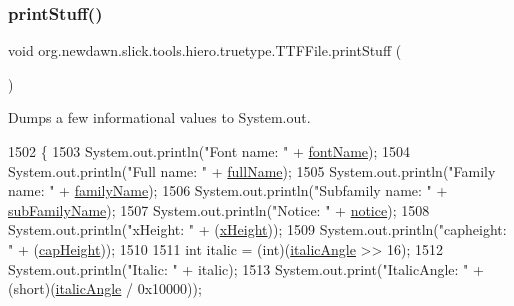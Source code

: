 \subsubsection{\texorpdfstring{print\+Stuff()}{printStuff()}}
{\footnotesize\ttfamily void org.\+newdawn.\+slick.\+tools.\+hiero.\+truetype.\+T\+T\+F\+File.\+print\+Stuff (\begin{DoxyParamCaption}{ }\end{DoxyParamCaption})\hspace{0.3cm}{\ttfamily [inline]}}

Dumps a few informational values to System.\+out. 
\begin{DoxyCode}
1502                              \{
1503         System.out.println(\textcolor{stringliteral}{"Font name:   "} + \mbox{\hyperlink{classorg_1_1newdawn_1_1slick_1_1tools_1_1hiero_1_1truetype_1_1_t_t_f_file_ab15434422810a00c9337aa7ed38f8539}{fontName}});
1504         System.out.println(\textcolor{stringliteral}{"Full name:   "} + \mbox{\hyperlink{classorg_1_1newdawn_1_1slick_1_1tools_1_1hiero_1_1truetype_1_1_t_t_f_file_ac7ecb2518ff51c2a332c69d50cfbf35b}{fullName}});
1505         System.out.println(\textcolor{stringliteral}{"Family name: "} + \mbox{\hyperlink{classorg_1_1newdawn_1_1slick_1_1tools_1_1hiero_1_1truetype_1_1_t_t_f_file_a9888cb4831ec8b916a0a8ac0f6865bbe}{familyName}});
1506         System.out.println(\textcolor{stringliteral}{"Subfamily name: "} + \mbox{\hyperlink{classorg_1_1newdawn_1_1slick_1_1tools_1_1hiero_1_1truetype_1_1_t_t_f_file_a5584d310e65c24aa3ea85ce0afe13401}{subFamilyName}});
1507         System.out.println(\textcolor{stringliteral}{"Notice:      "} + \mbox{\hyperlink{classorg_1_1newdawn_1_1slick_1_1tools_1_1hiero_1_1truetype_1_1_t_t_f_file_aff447127456bb5b74f2f604b796159b0}{notice}});
1508         System.out.println(\textcolor{stringliteral}{"xHeight:     "} + (\mbox{\hyperlink{classorg_1_1newdawn_1_1slick_1_1tools_1_1hiero_1_1truetype_1_1_t_t_f_file_ac9dd4fd59ff8fe8fbc4aac821bcd748e}{xHeight}}));
1509         System.out.println(\textcolor{stringliteral}{"capheight:   "} + (\mbox{\hyperlink{classorg_1_1newdawn_1_1slick_1_1tools_1_1hiero_1_1truetype_1_1_t_t_f_file_ab67a8ec96a9df5e61c316493705b9d1f}{capHeight}}));
1510 
1511         \textcolor{keywordtype}{int} italic = (int)(\mbox{\hyperlink{classorg_1_1newdawn_1_1slick_1_1tools_1_1hiero_1_1truetype_1_1_t_t_f_file_af306b1630e161125026d93d856324aff}{italicAngle}} >> 16);
1512         System.out.println(\textcolor{stringliteral}{"Italic:      "} + italic);
1513         System.out.print(\textcolor{stringliteral}{"ItalicAngle: "} + (\textcolor{keywordtype}{short})(\mbox{\hyperlink{classorg_1_1newdawn_1_1slick_1_1tools_1_1hiero_1_1truetype_1_1_t_t_f_file_af306b1630e161125026d93d856324aff}{italicAngle}} / 0x10000));

\end{DoxyCode}
